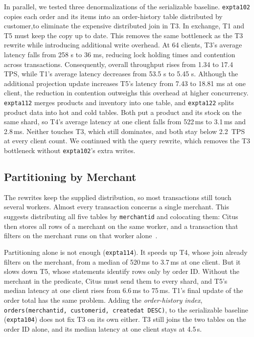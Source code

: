 \documentclass[sigconf,10pt,nonacm]{acmart}
\newcommand{\expt}[1]{\texttt{expt\textunderscore #1}}
\renewcommand{\_}{\underscorewithoutbreak\allowbreak}
\begin{document}
In parallel, we tested three denormalizations of the serializable baseline.
\expt{a102} copies each order and its items into an order-history table distributed by
customer,to eliminate the expensive distributed join in T3.  In exchange, T1 and T5 must
keep the copy up to date. This removes the same bottleneck as the T3 rewrite while introducing additional write overhead. At 64 clients, T3's average latency falls from 258 s to 36 ms, reducing lock holding times and contention across transactions. Consequently, overall throughput rises from 1.34 to 17.4 TPS, while T1's average latency decreases from 53.5 s to 5.45 s. Although the additional projection update increases T5's latency from 7.43 to 18.81 ms at one client, the reduction in contention outweighs this overhead at higher concurrency. \expt{a112} merges products and inventory into one table, and
\expt{a122} splits product data into hot and cold tables. Both put a
product and its stock on the same shard, so T4's average latency at one client falls
from 522\,ms to 3.1\,ms and 2.8\,ms. Neither touches T3, which still dominates, and both
stay below 2.2~TPS at every client count. We continued with the query rewrite, which
removes the T3 bottleneck without \expt{a102}'s extra writes.

\subsection{Partitioning by Merchant}
\label{sec:partitioning}

The rewrites keep the supplied distribution, so most transactions still touch several
workers. Almost every transaction concerns a single merchant. This suggests
distributing all five tables by \texttt{merchant\_id} and colocating them: Citus then
stores all rows of a merchant on the same worker, and a transaction that filters on the
merchant runs on that worker alone~\cite{ozsu2020}.

Partitioning alone is not enough (\expt{a114}). It speeds up T4, whose join already
filters on the merchant, from a median of 520\,ms to 3.7\,ms at one client. But it
slows down T5, whose statements identify rows only by order ID. Without the merchant in
the predicate, Citus must send them to every shard, and T5's median latency at one
client rises from 6.6\,ms to 75\,ms. T1's final update of the order total has the same
problem. Adding the \emph{order-history index}, \texttt{orders(merchant\_id,
customer\_id, created\_at DESC)}, to the serializable baseline (\expt{a104}) does not
fix T3 on its own either. T3 still joins the two tables on the order ID alone, and its
median latency at one client stays at 4.5\,s.
\end{document}
